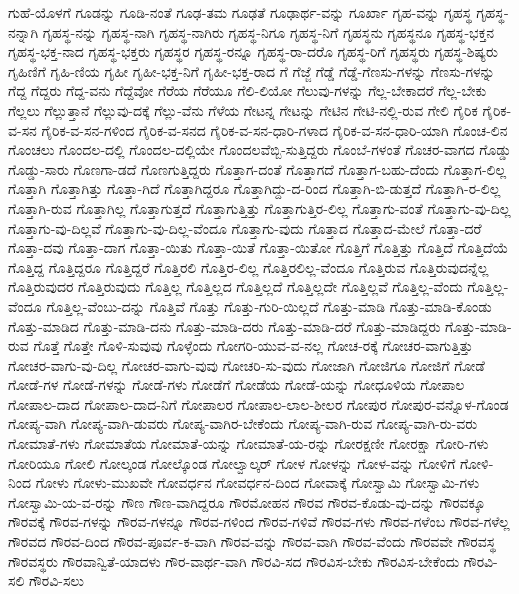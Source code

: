 {ಗುಹೆ-ಯೊಳಗೆ
ಗೂಡನ್ನು
ಗೂಡಿ-ನಂತೆ
ಗೂಢ-ತಮ
ಗೂಢತೆ
ಗೂಢಾರ್ಥ-ವನ್ನು
ಗೂರ್ಖಾ
ಗೃಹ-ವನ್ನು
ಗೃಹಸ್ಥ
ಗೃಹಸ್ಥ-ನನ್ನಾಗಿ
ಗೃಹಸ್ಥ-ನನ್ನು
ಗೃಹಸ್ಥ-ನಾಗಿ
ಗೃಹಸ್ಥ-ನಾಗಿರು
ಗೃಹಸ್ಥ-ನಿಗೂ
ಗೃಹಸ್ಥ-ನಿಗೆ
ಗೃಹಸ್ಥನು
ಗೃಹಸ್ಥನೂ
ಗೃಹಸ್ಥ-ಭಕ್ತನ
ಗೃಹಸ್ಥ-ಭಕ್ತ-ನಾದ
ಗೃಹಸ್ಥ-ಭಕ್ತರು
ಗೃಹಸ್ಥರ
ಗೃಹಸ್ಥ-ರನ್ನೂ
ಗೃಹಸ್ಥ-ರಾ-ದರೊ
ಗೃಹಸ್ಥ-ರಿಗೆ
ಗೃಹಸ್ಥರು
ಗೃಹಸ್ಥ-ಶಿಷ್ಯರು
ಗೃಹಿಣಿಗೆ
ಗೃಹಿ-ಣಿಯ
ಗೃಹೀ
ಗೃಹೀ-ಭಕ್ತ-ನಿಗೆ
ಗೃಹೀ-ಭಕ್ತ-ರಾದ
ಗೆ
ಗೆಜ್ಜೆ
ಗೆಡ್ಡೆ
ಗೆಡ್ಡೆ-ಗೆಣಸು-ಗಳನ್ನು
ಗೆಣಸು-ಗಳನ್ನು
ಗೆದ್ದ
ಗೆದ್ದರು
ಗೆದ್ದ-ವನು
ಗೆದ್ದೆವೋ
ಗೆರೆಯ
ಗೆರೆಯೂ
ಗೆಲಿ-ಲಿಯೋ
ಗೆಲುವು-ಗಳನ್ನು
ಗೆಲ್ಲ-ಬೇಕಾದರೆ
ಗೆಲ್ಲ-ಬೇಕು
ಗೆಲ್ಲಲು
ಗೆಲ್ಲುತ್ತಾನೆ
ಗೆಲ್ಲುವು-ದಕ್ಕೆ
ಗೆಲ್ಲು-ವೆನು
ಗೆಳೆಯ
ಗೇಟನ್ನ
ಗೇಟನ್ನು
ಗೇಟಿನ
ಗೇಟಿ-ನಲ್ಲಿ-ರುವ
ಗೇಲಿ
ಗೈರಿಕ
ಗೈರಿಕ-ವ-ಸನ
ಗೈರಿಕ-ವ-ಸನ-ಗಳಿಂದ
ಗೈರಿಕ-ವ-ಸನದ
ಗೈರಿಕ-ವ-ಸನ-ಧಾರಿ-ಗಳಾದ
ಗೈರಿಕ-ವ-ಸನ-ಧಾರಿ-ಯಾಗಿ
ಗೊಂಚ-ಲಿನ
ಗೊಂಚಲು
ಗೊಂದಲ-ದಲ್ಲಿ
ಗೊಂದಲ-ದಲ್ಲಿಯೇ
ಗೊಂದಲವೆಬ್ಬಿ-ಸುತ್ತಿದ್ದರು
ಗೊಂಬೆ-ಗಳಂತೆ
ಗೊಚರ-ವಾಗದ
ಗೊಡ್ಡು
ಗೊಡ್ಡು-ಸಾರು
ಗೊಣಗಾ-ಡದೆ
ಗೊಣಗುತ್ತಿದ್ದರು
ಗೊತ್ತಾಗ-ದಂತೆ
ಗೊತ್ತಾಗದೆ
ಗೊತ್ತಾಗ-ಬಹು-ದೆಂದು
ಗೊತ್ತಾಗ-ಲಿಲ್ಲ
ಗೊತ್ತಾಗಿ
ಗೊತ್ತಾಗಿತ್ತು
ಗೊತ್ತಾ-ಗಿದೆ
ಗೊತ್ತಾಗಿದ್ದರೂ
ಗೊತ್ತಾಗಿದ್ದು-ದ-ರಿಂದ
ಗೊತ್ತಾಗಿ-ಬಿ-ಡುತ್ತದೆ
ಗೊತ್ತಾಗಿ-ರ-ಲಿಲ್ಲ
ಗೊತ್ತಾಗಿ-ರುವ
ಗೊತ್ತಾಗಿಲ್ಲ
ಗೊತ್ತಾಗುತ್ತದೆ
ಗೊತ್ತಾಗುತ್ತಿತ್ತು
ಗೊತ್ತಾಗುತ್ತಿರ-ಲಿಲ್ಲ
ಗೊತ್ತಾಗು-ವಂತೆ
ಗೊತ್ತಾಗು-ವು-ದಿಲ್ಲ
ಗೊತ್ತಾಗು-ವು-ದಿಲ್ಲವೆ
ಗೊತ್ತಾಗು-ವು-ದಿಲ್ಲ-ವೆಂದೂ
ಗೊತ್ತಾಗು-ವುದು
ಗೊತ್ತಾದ
ಗೊತ್ತಾದ-ಮೇಲೆ
ಗೊತ್ತಾ-ದರೆ
ಗೊತ್ತಾ-ದವು
ಗೊತ್ತಾ-ದಾಗ
ಗೊತ್ತಾ-ಯಿತು
ಗೊತ್ತಾ-ಯಿತೆ
ಗೊತ್ತಾ-ಯಿತೋ
ಗೊತ್ತಿಗೆ
ಗೊತ್ತಿತ್ತು
ಗೊತ್ತಿದೆ
ಗೊತ್ತಿದೆಯೆ
ಗೊತ್ತಿದ್ದ
ಗೊತ್ತಿದ್ದರೂ
ಗೊತ್ತಿದ್ದರೆ
ಗೊತ್ತಿರಲಿ
ಗೊತ್ತಿರ-ಲಿಲ್ಲ
ಗೊತ್ತಿರಲಿಲ್ಲ-ವೆಂದೂ
ಗೊತ್ತಿರುವ
ಗೊತ್ತಿರುವುದನ್ನೆಲ್ಲ
ಗೊತ್ತಿರುವುದರ
ಗೊತ್ತಿರುವುದು
ಗೊತ್ತಿಲ್ಲ
ಗೊತ್ತಿಲ್ಲದ
ಗೊತ್ತಿಲ್ಲದೆ
ಗೊತ್ತಿಲ್ಲದೇ
ಗೊತ್ತಿಲ್ಲವೆ
ಗೊತ್ತಿಲ್ಲ-ವೆಂದು
ಗೊತ್ತಿಲ್ಲ-ವೆಂದೂ
ಗೊತ್ತಿಲ್ಲ-ವೆಂಬು-ದನ್ನು
ಗೊತ್ತಿವೆ
ಗೊತ್ತು
ಗೊತ್ತು-ಗುರಿ-ಯಿಲ್ಲದೆ
ಗೊತ್ತು-ಮಾಡಿ
ಗೊತ್ತು-ಮಾಡಿ-ಕೊಂಡು
ಗೊತ್ತು-ಮಾಡಿದ
ಗೊತ್ತು-ಮಾಡಿ-ದನು
ಗೊತ್ತು-ಮಾಡಿ-ದರು
ಗೊತ್ತು-ಮಾಡಿ-ದರೆ
ಗೊತ್ತು-ಮಾಡಿದ್ದರು
ಗೊತ್ತು-ಮಾಡಿ-ರುವ
ಗೊತ್ತೆ
ಗೊತ್ತೇ
ಗೊಳಿ-ಸುವುವು
ಗೊಳ್ಳೆಂದು
ಗೋಗರಿ-ಯುವ-ವ-ನಲ್ಲ
ಗೋಚ-ರಕ್ಕೆ
ಗೋಚರ-ವಾಗುತ್ತಿತ್ತು
ಗೋಚರ-ವಾಗು-ವು-ದಿಲ್ಲ
ಗೋಚರ-ವಾಗು-ವುವು
ಗೋಚರಿ-ಸು-ವುದು
ಗೋಜಾಗಿ
ಗೋಜಿಗೂ
ಗೋಜಿಗೆ
ಗೋಡೆ
ಗೋಡೆ-ಗಳ
ಗೋಡೆ-ಗಳನ್ನು
ಗೋಡೆ-ಗಳು
ಗೋಡೆಗೆ
ಗೋಡೆಯ
ಗೋಡೆ-ಯನ್ನು
ಗೋಧೂಳಿಯ
ಗೋಪಾಲ
ಗೋಪಾಲ-ದಾದ
ಗೋಪಾಲ-ದಾದ-ನಿಗೆ
ಗೋಪಾಲರ
ಗೋಪಾಲ-ಲಾಲ-ಶೀಲರ
ಗೋಪುರ
ಗೋಪುರ-ವನ್ನೊಳ-ಗೊಂಡ
ಗೋಪ್ಯ-ವಾಗಿ
ಗೋಪ್ಯ-ವಾಗಿ-ಡುವರು
ಗೋಪ್ಯ-ವಾಗಿರ-ಬೇಕೆಂದು
ಗೋಪ್ಯ-ವಾಗಿ-ರುವ
ಗೋಪ್ಯ-ವಾಗಿ-ರು-ವರು
ಗೋಮಾತೆ-ಗಳು
ಗೋಮಾತೆಯ
ಗೋಮಾತೆ-ಯನ್ನು
ಗೋಮಾತೆ-ಯ-ರನ್ನು
ಗೋರಕ್ಷಣೀ
ಗೋರಕ್ಷಾ
ಗೋರಿ-ಗಳು
ಗೋರಿಯೂ
ಗೋಲಿ
ಗೋಲ್ಕಂಡ
ಗೋಲ್ಕೊಂಡ
ಗೋಲ್ವಾಲ್ಕರ್
ಗೋಳ
ಗೋಳನ್ನು
ಗೋಳ-ವನ್ನು
ಗೋಳಿಗೆ
ಗೋಳಿ-ನಿಂದ
ಗೋಳು
ಗೋಳು-ಮುಖವೇ
ಗೋವರ್ಧನ
ಗೋವರ್ಧನ-ದಿಂದ
ಗೋವಾಕ್ಕೆ
ಗೋಸ್ವಾಮಿ
ಗೋಸ್ವಾಮಿ-ಗಳು
ಗೋಸ್ವಾಮಿ-ಯ-ವ-ರನ್ನು
ಗೌಣ
ಗೌಣ-ವಾಗಿದ್ದರೂ
ಗೌರಮೋಹನ
ಗೌರವ
ಗೌರವ-ಕೊಡು-ವು-ದನ್ನು
ಗೌರವಕ್ಕೂ
ಗೌರವಕ್ಕೆ
ಗೌರವ-ಗಳನ್ನು
ಗೌರವ-ಗಳನ್ನೂ
ಗೌರವ-ಗಳಿಂದ
ಗೌರವ-ಗಳಿವೆ
ಗೌರವ-ಗಳು
ಗೌರವ-ಗಳೆಂಬ
ಗೌರವ-ಗಳೆಲ್ಲ
ಗೌರವದ
ಗೌರವ-ದಿಂದ
ಗೌರವ-ಪೂರ್ವ-ಕ-ವಾಗಿ
ಗೌರವ-ವನ್ನು
ಗೌರವ-ವಾಗಿ
ಗೌರವ-ವೆಂದು
ಗೌರವವೇ
ಗೌರವಸ್ಥ
ಗೌರವಸ್ಥರು
ಗೌರವಾನ್ವಿತೆ-ಯಾದಳು
ಗೌರ-ವಾರ್ಥ-ವಾಗಿ
ಗೌರವಿ-ಸದ
ಗೌರವಿಸ-ಬೇಕು
ಗೌರವಿಸ-ಬೇಕೆಂದು
ಗೌರವಿ-ಸಲಿ
ಗೌರವಿ-ಸಲು
}
